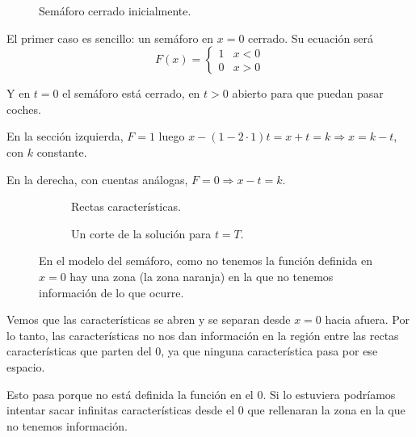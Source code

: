		\begin{example}[Semáforo] \label{ejm:Semaforo}
			\begin{wrapfigure}[8]{L}{0.4\textwidth}
				\centering
				\vspace{-15pt}
				\vspace{-15pt}
				\caption{Semáforo cerrado inicialmente.}
				\label{fig:semaforoCerrado}
			\end{wrapfigure}

			El primer caso es sencillo: un semáforo en $x = 0$ cerrado. Su ecuación será \[
			F(x) =
			\begin{cases}
				1 & x < 0 \\
				0 & x > 0
			\end{cases}
			\]

			Y en $t=0$ el semáforo está cerrado, en $t>0$ abierto para que puedan pasar coches.

			En la sección izquierda, $F = 1$ luego $x - (1 - 2·1)t = x + t = k \Rightarrow x = k -t $, con $k$ constante.

			En la derecha, con cuentas análogas, $F = 0 \Rightarrow x-t = k$.

			\begin{figure}[htbp]
				\centering
				\begin{subfigure}[b]{0.49\textwidth}
				\vspace{-8pt}
				\caption{Rectas características.}
				\end{subfigure}
				\begin{subfigure}[b]{0.49\textwidth}
				\caption{Un corte de la solución para $t = T$.}
				\end{subfigure}
				\caption{En el modelo del semáforo, como no tenemos la función definida en $x = 0$ hay una zona (la zona naranja) en la que no tenemos información de lo que ocurre.}
				\label{fig:caracteristicasSemaforo}
			\end{figure}

			Vemos que las características se abren y se separan desde $x=0$ hacia afuera. Por lo tanto, las características no nos dan información en la región entre las rectas características que parten del $0$, ya que ninguna característica pasa por ese espacio.

			Esto pasa porque no está definida la función en el $0$. Si lo estuviera podríamos intentar sacar infinitas características desde el 0 que rellenaran la zona en la que no tenemos información.

		\end{example}

